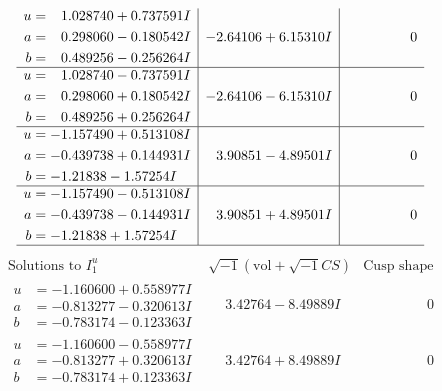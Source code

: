 \documentclass[1p]{elsarticle_modified}
\theoremstyle{definition}
\newcommand{\I}{\sqrt{-1}}
\begin{document}
$$\begin{array}{c|c|c}
\begin{aligned}
u &= \phantom{-}1.028740 + 0.737591 I \\
a &= \phantom{-}0.298060 - 0.180542 I \\
b &= \phantom{-}0.489256 - 0.256264 I\end{aligned}
 & -2.64106 + 6.15310 I & \phantom{-0.000000 } 0 \\ \hline\begin{aligned}
u &= \phantom{-}1.028740 - 0.737591 I \\
a &= \phantom{-}0.298060 + 0.180542 I \\
b &= \phantom{-}0.489256 + 0.256264 I\end{aligned}
 & -2.64106 - 6.15310 I & \phantom{-0.000000 } 0 \\ \hline\begin{aligned}
u &= -1.157490 + 0.513108 I \\
a &= -0.439738 + 0.144931 I \\
b &= -1.21838 - 1.57254 I\end{aligned}
 & \phantom{-}3.90851 - 4.89501 I & \phantom{-0.000000 } 0 \\ \hline\begin{aligned}
u &= -1.157490 - 0.513108 I \\
a &= -0.439738 - 0.144931 I \\
b &= -1.21838 + 1.57254 I\end{aligned}
 & \phantom{-}3.90851 + 4.89501 I & \phantom{-0.000000 } 0\\
 \hline 
 \end{array}$$\newpage$$\begin{array}{c|c|c}  
\text{Solutions to }I^u_{1}& \I (\text{vol} + \sqrt{-1}CS) & \text{Cusp shape}\\
 \hline 
\begin{aligned}
u &= -1.160600 + 0.558977 I \\
a &= -0.813277 - 0.320613 I \\
b &= -0.783174 - 0.123363 I\end{aligned}
 & \phantom{-}3.42764 - 8.49889 I & \phantom{-0.000000 } 0 \\ \hline\begin{aligned}
u &= -1.160600 - 0.558977 I \\
a &= -0.813277 + 0.320613 I \\
b &= -0.783174 + 0.123363 I\end{aligned}
 & \phantom{-}3.42764 + 8.49889 I & \phantom{-0.000000 } 0 \\ \hline\begin{aligned}

\end{aligned}
\end{array}$$
\end{document}
